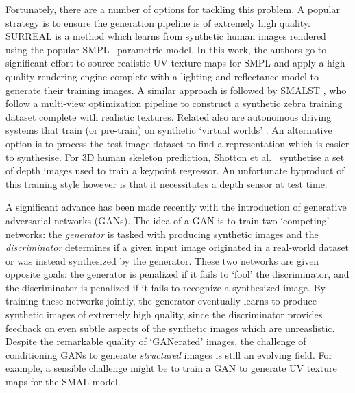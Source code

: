 Fortunately, there are a number of options for tackling this problem. A popular strategy is to ensure the generation pipeline is of extremely high quality. SURREAL is a method which learns from synthetic human images rendered using the popular SMPL~\cite{loper15smpl} parametric model. In this work, the authors go to significant effort to source realistic UV texture maps for SMPL and apply a high quality rendering engine complete with a lighting and reflectance model to generate their training images. A similar approach is followed by SMALST , who follow a multi-view optimization pipeline to construct a synthetic zebra training dataset complete with realistic textures. Related also are autonomous driving systems that train (or pre-train) on synthetic `virtual worlds' . An alternative option is to process the test image dataset to find a representation which is easier to synthesise. For 3D human skeleton prediction, Shotton et al.~\cite{shotton-kinect} synthetise a set of depth images used to train a keypoint regressor. An unfortunate byproduct of this training style however is that it necessitates a depth sensor at test time. 


A significant advance has been made recently with the introduction of generative adversarial networks (GANs). The idea of a GAN is to train two `competing' networks: the \emph{generator} is tasked with producing synthetic images and the \emph{discriminator} determines if a given input image originated in a real-world dataset or was instead synthesized by the generator. These two networks are given opposite goals: the generator is penalized if it fails to `fool' the discriminator, and the discriminator is penalized if it fails to recognize a synthesized image. By training these networks jointly, the generator eventually learns to produce synthetic images of extremely high quality, since the discriminator provides feedback on even subtle aspects of the synthetic images which are unreaslistic. Despite the remarkable quality of `GANerated' images, the challenge of conditioning GANs to generate \emph{structured} images is still an evolving field. For example, a sensible challenge might be to train a GAN to generate UV texture maps for the SMAL model. 


